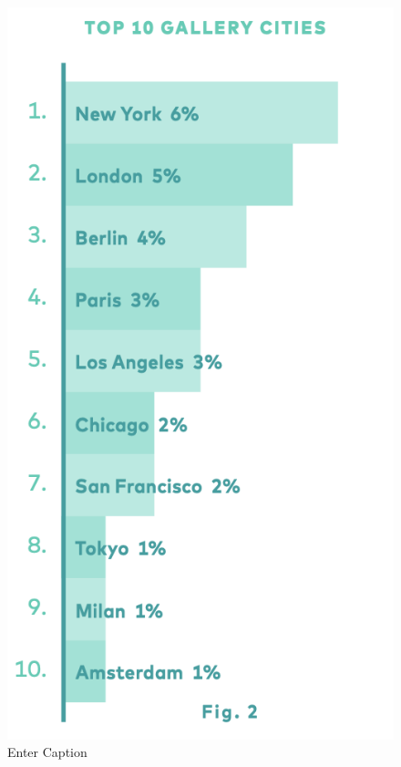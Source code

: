 \documentclass[a4paper, twoside, 12pt]{book}
\begin{document}
    \begin{figure}
        \centering
        \includegraphics[width=0.5\linewidth]{Screenshot 2023-06-15 at 11.46.30.png}
        \caption{Enter Caption}
        \label{fig:enter-label}
    \end{figure}
    
\end{document}
